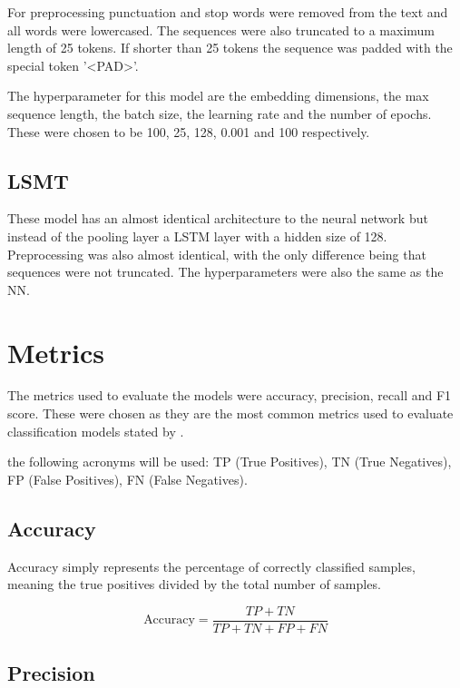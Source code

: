 For preprocessing punctuation and stop words were removed from the text and all
words were lowercased. The sequences were also truncated to a maximum length of
25 tokens. If shorter than 25 tokens the sequence was padded with the special
token '\textless PAD\textgreater'.

The hyperparameter for this model are the embedding dimensions, the max
sequence length, the batch size, the learning rate and the number of epochs.
These were chosen to be 100, 25, 128, 0.001 and 100 respectively.

\subsection{LSMT}

These model has an almost identical architecture to the neural network but
instead of the pooling layer a LSTM layer with a hidden size of 128.
Preprocessing was also almost identical, with the only difference being that
sequences were not truncated. The hyperparameters were also the same as the NN.

\section{Metrics}

The metrics used to evaluate the models were accuracy, precision, recall and F1
score. These were chosen as they are the most common metrics used to evaluate
classification models stated by \cite{lieskovska2021review}.

the following acronyms will be used: TP (True Positives), TN (True Negatives),
FP (False Positives), FN (False Negatives).

\subsection{Accuracy}

Accuracy simply represents the percentage of correctly classified samples,
meaning the true positives divided by the total number of samples.

\begin{equation}
    \text{Accuracy} = \frac{TP + TN}{TP + TN + FP + FN}
\end{equation}

\subsection{Precision}


